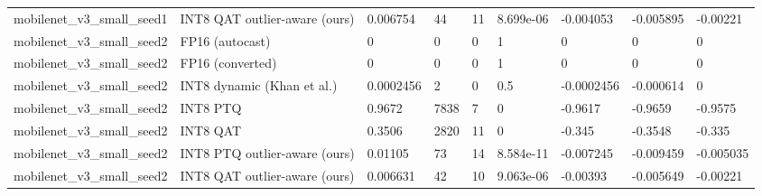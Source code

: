 \begin{table}[t]
\begin{tabular}{lllllllll}
mobilenet\_v3\_small\_seed1 & INT8 QAT outlier-aware (ours) & 0.006754 & 44 & 11 & 8.699e-06 & -0.004053 & -0.005895 & -0.00221 \\
mobilenet\_v3\_small\_seed2 & FP16 (autocast) & 0 & 0 & 0 & 1 & 0 & 0 & 0 \\
mobilenet\_v3\_small\_seed2 & FP16 (converted) & 0 & 0 & 0 & 1 & 0 & 0 & 0 \\
mobilenet\_v3\_small\_seed2 & INT8 dynamic (Khan et al.) & 0.0002456 & 2 & 0 & 0.5 & -0.0002456 & -0.000614 & 0 \\
mobilenet\_v3\_small\_seed2 & INT8 PTQ & 0.9672 & 7838 & 7 & 0 & -0.9617 & -0.9659 & -0.9575 \\
mobilenet\_v3\_small\_seed2 & INT8 QAT & 0.3506 & 2820 & 11 & 0 & -0.345 & -0.3548 & -0.335 \\
mobilenet\_v3\_small\_seed2 & INT8 PTQ outlier-aware (ours) & 0.01105 & 73 & 14 & 8.584e-11 & -0.007245 & -0.009459 & -0.005035 \\
mobilenet\_v3\_small\_seed2 & INT8 QAT outlier-aware (ours) & 0.006631 & 42 & 10 & 9.063e-06 & -0.00393 & -0.005649 & -0.00221 \\
\bottomrule
\end{tabular}
\end{table}
